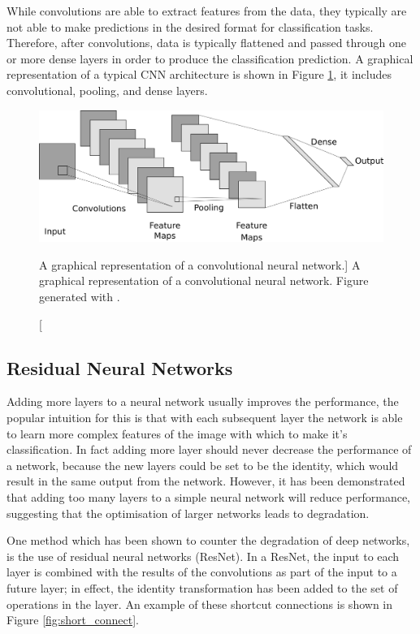 \bigskip

While convolutions are able to extract features from the data, they typically
are not able to make predictions in the desired format for classification tasks.
Therefore, after convolutions, data is typically flattened and passed through
one or more dense layers in order to produce the classification prediction. A
graphical representation of a typical CNN architecture is shown in Figure
\ref{fig:cnn_layer}, it includes convolutional, pooling, and dense layers.

\begin{figure}

	\centering

	\includegraphics[width = \textwidth]{figures/cnn_layer.png}

	\caption
	[A graphical representation of a convolutional neural network.]
	{ A graphical representation of a convolutional neural network. Figure
	generated with \cite{cnn_diagrams}.}

	\label{fig:cnn_layer}

\end{figure}

\subsection{Residual Neural Networks}
Adding more layers to a neural network usually improves the performance, the
popular intuition for this is that with each subsequent layer the network is
able to learn more complex features of the image with which to make it's
classification. In fact adding more layer should never decrease the 
performance of a network, because the new layers could be set to be the 
identity, which would result in the same output from the network. However, it 
has been demonstrated that adding too many layers to a simple neural network 
will reduce performance, suggesting that the optimisation of
larger networks leads to degradation\cite{He_2016_CVPR}.

One method which has been shown to counter the degradation of deep networks, 
is the use of residual neural networks (ResNet). In a ResNet, the input to 
each layer is combined with the results of the convolutions as part of the 
input to a future layer; in effect, the identity transformation has been added
to the set of operations in the layer. An example of these shortcut connections 
is shown in Figure \ref{fig:short_connect}\cite{He_2016_CVPR}. 

